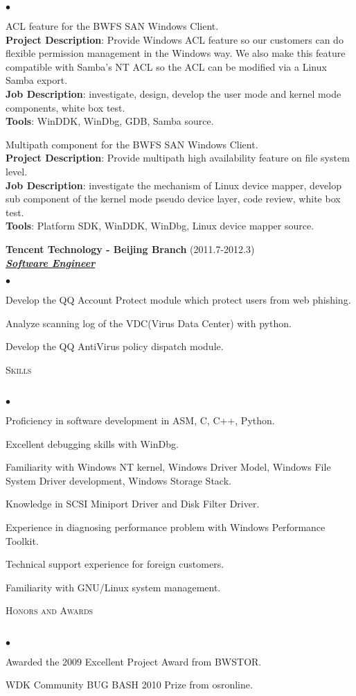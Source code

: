 \documentclass{article}
\newcommand{\lineunder}{\vspace*{-8pt} \\ \hspace*{-18pt} \hrulefill \\}
\newcommand{\header}[1]{{\hspace*{-15pt}\vspace*{6pt} \textsc{#1}} \vspace*{-6pt} \lineunder}
\newcommand{\employer}[3]{{ \textbf{#1} (#2)\\ \underline{\textbf{\emph{#3}}}\\}}
\newcommand{\project}[4]{{#1}\\ \textbf{Project Description}:
  {#2}\\ \textbf{Job Description}: {#3}\\ \textbf{Tools}: {#4}\vspace*{3pt}}
\newenvironment{achievements}{\begin{list}{$\bullet$}{\topsep 0pt
      \itemsep -2pt}}{\vspace*{6pt}\end{list}}
\begin{document}
\begin{achievements}
        \item 
          \project{ACL feature for the BWFS SAN Windows Client.}
          {Provide Windows ACL feature so our customers can do
            flexible permission management in the Windows way. We also
            make this feature compatible with Samba's NT ACL so the
            ACL can be modified via a Linux Samba export.}
          {investigate, design, develop the user mode and kernel mode
            components, white box test.}
          {WinDDK, WinDbg, GDB, Samba source.}
        \item 
          \project{Multipath component for the BWFS SAN Windows Client.}
          {Provide multipath high availability feature on file system
            level.}
          {investigate the mechanism of Linux device mapper, develop
            sub component of the kernel mode pseudo device layer, code
            review, white box test.}
          {Platform SDK, WinDDK, WinDbg, Linux device mapper source.}
	\end{achievements}

\employer{Tencent Technology - Beijing Branch}{2011.7-2012.3} {Software Engineer}
	\begin{achievements}
	\item Develop the QQ Account Protect module which protect users from web phishing.
	\item Analyze scanning log of the VDC(Virus Data Center) with python.
	\item Develop the QQ AntiVirus policy dispatch module.
	\end{achievements}


\header{Skills}
\begin{achievements}
\item Proficiency in software development in ASM, C, C++, Python.
\item Excellent debugging skills with WinDbg.
\item Familiarity with Windows NT kernel, Windows Driver Model,
  Windows File System Driver development, Windows Storage Stack.
\item Knowledge in SCSI Miniport Driver and Disk Filter Driver.
\item Experience in diagnosing performance problem with Windows
  Performance Toolkit.
\item Technical support experience for foreign customers.
\item Familiarity with GNU/Linux system management.
\end{achievements}


\header{Honors and Awards}
\begin{achievements}
\item Awarded the 2009 Excellent Project Award from BWSTOR.
\item WDK Community BUG BASH 2010 Prize from osronline.
\end{achievements}
\end{document}
